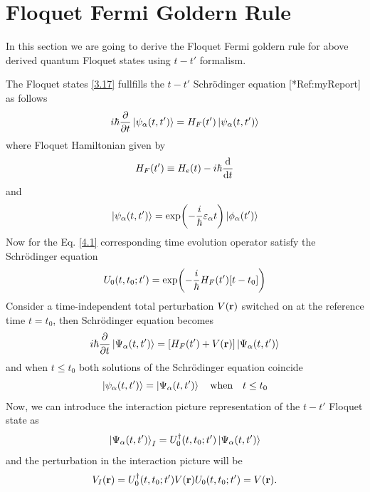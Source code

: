 \section{Floquet Fermi Goldern Rule}

In this section we are going to derive the Floquet Fermi goldern rule for above derived quantum Floquet states using $t-t'$ formalism.

\vspace{5mm}
\noindent
The Floquet states \eqref{3.17} fullfills the $t-t'$ Schrödinger equation [*Ref:myReport] as follows
\begin{equation} \label{4.1}
  i \hbar \pdv{t}\ket{\psi_{\alpha}(t,t')} =
  H_F(t') \ket{\psi_{\alpha}(t,t')}
\end{equation}
where Floquet Hamiltonian given by
\begin{equation} \label{4.2}
  H_F(t') \equiv
  H_e(t) - i\hbar \dv{t}
\end{equation}
and
\begin{equation} \label{4.3}
  \ket{\psi_{\alpha}(t,t')} =
  \exp(-\frac{i}{\hbar}\varepsilon_{\alpha} t)\ket{\phi_{\alpha}(t')}
\end{equation}
Now for the Eq. \eqref{4.1} corresponding time evolution operator satisfy the Schrödinger equation
\begin{equation} \label{4.4}
  U_0(t,t_0;t') = \exp(-\frac{i}{\hbar}H_F(t')\qty[t-t_0])
\end{equation}
Consider a time-independent total perturbation $V(\mathbf{r})$ switched on at the reference time $t=t_0$, then Schrödinger equation becomes
\begin{equation} \label{4.5}
  i \hbar \pdv{t}\ket{\Psi_{\alpha}(t,t')} =
  \qty[H_F(t') + V(\mathbf{r})]\ket{\Psi_{\alpha}(t,t')}
\end{equation}
and when $t\leq t_0$ both solutions of the Schrödinger equation coincide
\begin{equation} \label{4.6}
  \ket{\psi_{\alpha}(t,t')} =\ket{\Psi_{\alpha}(t,t')} \quad
  \text{when} \quad
  t \leq t_0
\end{equation}
Now, we can introduce the interaction picture representation of the $t-t'$ Floquet state as
\begin{equation} \label{4.7}
  \ket{\Psi_{\alpha}(t,t')}_I = U_0^{\dagger}(t,t_0;t')
  \ket{\Psi_{\alpha}(t,t')}
\end{equation}
and the perturbation in the interaction picture will be
\begin{equation} \label{4.8}
  V_I(\mathbf{r}) = U_0^{\dagger}(t,t_0;t')V(\mathbf{r})U_0(t,t_0;t') =
  V(\mathbf{r}).
\end{equation}
